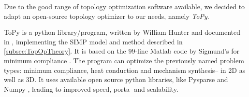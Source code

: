 \label{sec:ToPy}
Due to the good range of topology optimization software available, we decided to adapt an open-source topology optimizer to our needs, namely \emph{ToPy}.


ToPy \cite{ToPy} is a python library/program, written by William Hunter and documented in \cite{Hunter2009}, implementing the SIMP model and method described in \autoref{subsec:TopOpTheory}. It is based on the 99-line Matlab code by Sigmund's for minimum compliance \cite{sigmund200199}. The program can optimize the previously named problem types: minimum compliance, heat conduction and mechanism synthesis-- in 2D as well as 3D. It uses available open source python libraries, like Pysparse \cite{Pysparse} and Numpy \cite{Numpy}, leading to improved speed, porta- and scalability. %


